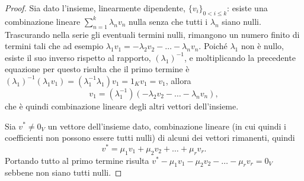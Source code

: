 \begin{proof}
	Sia dato l'insieme, linearmente dipendente, $\{  v_i\}_{0<i\leq k}$: esiste una combinazione lineare $\sum_{n=1}^k\lambda_n  v_n$ nulla senza che tutti i $\lambda_n$ siano nulli.
	Trascurando nella serie gli eventuali termini nulli, rimangono un numero finito di termini tali che ad esempio $\lambda_1  v_1=-\lambda_2  v_2-\dots-\lambda_n  v_n$.
	Poiché $\lambda_1$ non è nullo, esiste il suo inverso rispetto al rapporto, $(\lambda_1)^{-1}$, e moltiplicando la precedente equazione per questo risulta che il primo termine è $(\lambda_1)^{-1}(\lambda_1  v_1)=(\lambda_1^{-1}\lambda_1)  v_1=1_K  v_1=v_1$, allora
	\begin{equation*}
	  v_1=(\lambda_1^{-1})(-\lambda_2  v_2-\dots-\lambda_n  v_n),
	\end{equation*}
	che è quindi combinazione lineare degli altri vettori dell'insieme.

	Sia $  v^*\neq 0_V$ un vettore dell'insieme dato, combinazione lineare (in cui quindi i coefficienti non possono essere tutti nulli) di alcuni dei vettori rimanenti, quindi
	\begin{equation*}
		  v^*=\mu_1  v_1+\mu_2  v_2+\dots+\mu_r  v_r.
	\end{equation*}
	Portando tutto al primo termine risulta $  v^*-\mu_1  v_1-\mu_2  v_2-\dots-\mu_r  v_r=0_V$ sebbene non siano tutti nulli.
\end{proof}


